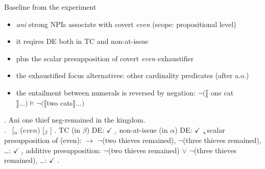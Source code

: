 \documentclass[
  ignorenonframetext,
]{beamer}
\providecommand{\tightlist}{%
  \setlength{\itemsep}{0pt}\setlength{\parskip}{0pt}}
\begin{document}
\begin{frame}
\begin{block}{Baseline from the experiment}
\protect\hypertarget{baseline-from-the-experiment}{}
\begin{itemize}
\tightlist
\item
  \emph{ani} strong NPIs associate with covert \emph{even} (scope:
  propositional level)
\item
  it reqires DE both in TC and non-at-issue
\item
  plus the scalar presupposition of covert \emph{even} exhaustifier
\item
  the exhaustified focus alternatives: other cardinality predicates
  (after \citealt{lahiri1998focus,crnic2011getting} a.o.)
\item
  the entailment between numerals is reversed by negation:
  \(\neg (\llbracket\) one cat
  \(\rrbracket \ldots) \models \neg(\llbracket\)two
  cats\(\rrbracket \ldots)\)
\end{itemize}

\footnotesize

\ex. Ani one thief neg-remained in the kingdom.\\
\a. ~{[}\(_\alpha\) (\(even\)) {[}\(_\beta\)
\neg [$_\gamma$ ani one thief remained in the kingdom ]{]} {]} \a. TC
(in \(\beta\)) DE: \(\checkmark\) \b. non-at-issue (in \(\alpha\)) DE:
\(\checkmark\) \c. scalar presupposition of (even): \(\rightarrow\)
\(\neg\)(two thieves remained), \(\neg\)(three thieves remained),
\ldots: \(\checkmark\) \d. additive presupposition: \(\neg\)(two thieves
remained) \(\vee\) \(\neg\)(three thieves remained), \ldots:
\(\checkmark\) \z.

~

\normalsize
\end{block}
\end{frame}
\end{document}
